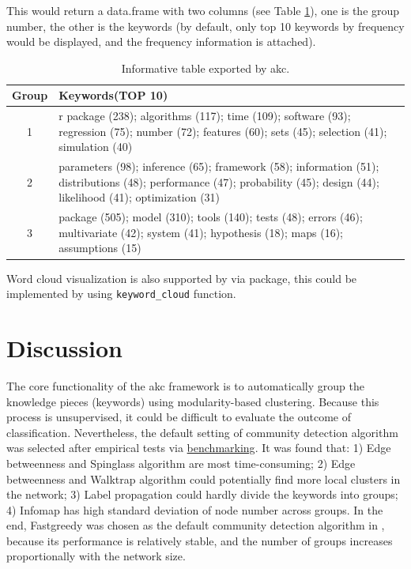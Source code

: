 This would return a data.frame with two columns (see Table
\ref{tab:tab1-2}), one is the group number, the other is the keywords
(by default, only top 10 keywords by frequency would be displayed, and
the frequency information is attached).

\begin{Schunk}
\begin{table}

\caption{\label{tab:tab1-2}Informative table exported by akc.}
\centering
\fontsize{7}{9}\selectfont
\begin{tabular}[t]{c|>{\centering\arraybackslash}p{10cm}}
\hline
Group & Keywords(TOP 10)\\
\hline
1 & r package (238); algorithms (117); time (109); software (93); regression (75); number (72); features (60); sets (45); selection (41); simulation (40)\\
\hline
2 & parameters (98); inference (65); framework (58); information (51); distributions (48); performance (47); probability (45); design (44); likelihood (41); optimization (31)\\
\hline
3 & package (505); model (310); tools (140); tests (48); errors (46); multivariate (42); system (41); hypothesis (18); maps (16); assumptions (15)\\
\hline
\end{tabular}
\end{table}

\end{Schunk}

Word cloud visualization is also supported by  via
 package, this could be implemented by using
\texttt{keyword\_cloud} function.

\hypertarget{discussion}{%
\section{Discussion}\label{discussion}}

The core functionality of the akc framework is to automatically group
the knowledge pieces (keywords) using modularity-based clustering.
Because this process is unsupervised, it could be difficult to evaluate
the outcome of classification. Nevertheless, the default setting of
community detection algorithm was selected after empirical tests via
\href{https://cran.r-project.org/web/packages/akc/vignettes/Benchmarking.html}{benchmarking}.
It was found that: 1) Edge betweenness and Spinglass algorithm are most
time-consuming; 2) Edge betweenness and Walktrap algorithm could
potentially find more local clusters in the network; 3) Label
propagation could hardly divide the keywords into groups; 4) Infomap has
high standard deviation of node number across groups. In the end,
Fastgreedy was chosen as the default community detection algorithm in
, because its performance is relatively stable, and the
number of groups increases proportionally with the network size.

